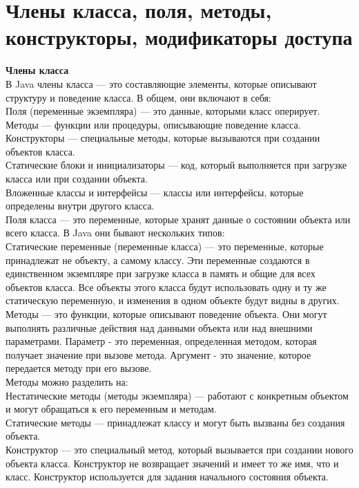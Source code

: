 \section{Члены класса, поля, методы, конструкторы, модификаторы доступа}
\textbf{Члены класса} \\
В Java члены класса — это составляющие элементы, которые описывают структуру и поведение класса. В общем, они включают в себя: \\
Поля (переменные экземпляра) — это данные, которыми класс оперирует. \\
Методы — функции или процедуры, описывающие поведение класса. \\
Конструкторы — специальные методы, которые вызываются при создании объектов класса. \\
Статические блоки и инициализаторы — код, который выполняется при загрузке класса или при создании объекта. \\
Вложенные классы и интерфейсы — классы или интерфейсы, которые определены внутри другого класса. \\
Поля класса — это переменные, которые хранят данные о состоянии объекта или всего класса. В Java они бывают нескольких типов: \\
Статические переменные (переменные класса) — это переменные, которые принадлежат не объекту, а самому классу. Эти переменные создаются в единственном экземпляре при загрузке класса в память и общие для всех объектов класса. Все объекты этого класса будут использовать одну и ту же статическую переменную, и изменения в одном объекте будут видны в других. \\
Методы — это функции, которые описывают поведение объекта. Они могут выполнять различные действия над данными объекта или над внешними параметрами. Параметр - это переменная, определенная методом, которая получает значение при вызове метода. Аргумент - это значение, которое передается методу при его вызове.  \\
Методы можно разделить на: \\
Нестатические методы (методы экземпляра) — работают с конкретным объектом и могут обращаться к его переменным и методам. \\
Статические методы — принадлежат классу и могут быть вызваны без создания объекта. \\
Конструктор — это специальный метод, который вызывается при создании нового объекта класса. Конструктор не возвращает значений и имеет то же имя, что и класс. Конструктор используется для задания начального состояния объекта. \\
